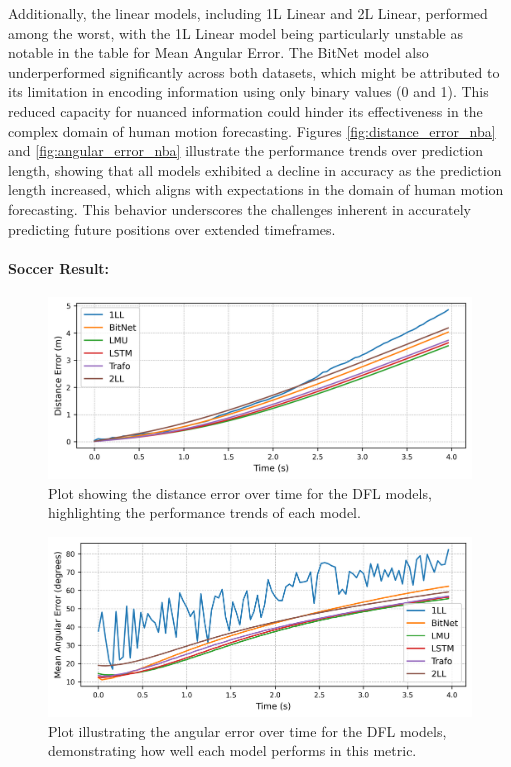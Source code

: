 Additionally, the linear models, including 1L Linear and 2L Linear, performed among the worst, with the 1L Linear model being particularly unstable as notable in the table for Mean Angular Error. The BitNet model also underperformed significantly across both datasets, which might be attributed to its limitation in encoding information using only binary values (0 and 1). This reduced capacity for nuanced information could hinder its effectiveness in the complex domain of human motion forecasting. Figures \ref{fig:distance_error_nba} and \ref{fig:angular_error_nba} illustrate the performance trends over prediction length, showing that all models exhibited a decline in accuracy as the prediction length increased, which aligns with expectations in the domain of human motion forecasting. This behavior underscores the challenges inherent in accurately predicting future positions over extended timeframes.

\newpage
\paragraph{Soccer Result:} 

\begin{figure}[t]
    \centering
    \includegraphics[width=\linewidth]{contents/results/soccer_error.png}
    \caption[Distance Error Over Time (DFL).]{Plot showing the distance error over time for the DFL models, highlighting the performance trends of each model.}
    \label{fig:distance_error_dfl}
\end{figure}
\begin{figure}[t]
    \centering
    \includegraphics[width=\linewidth]{contents/results/soccer_angle.png}
    \caption[Angular Error Over Time (DFL).]{Plot illustrating the angular error over time for the DFL models, demonstrating how well each model performs in this metric.}
    \label{fig:angular_error_dfl}
\end{figure}


